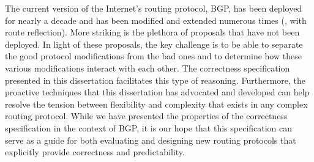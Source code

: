 The current version of the Internet's routing protocol, BGP, has been
deployed for nearly a decade and has been modified and extended numerous
times (\eg, with route reflection).  More striking is the plethora of
proposals that have not been deployed.  In light of these proposals, the
key challenge is to be able to separate the good protocol modifications
from the bad ones and to determine how these various modifications
interact with each other. 
The correctness specification presented in this dissertation facilitates
this type of reasoning. Furthermore, the proactive techniques that this
dissertation has advocated and developed can help resolve the tension
between flexibility and complexity that exists in any complex routing
protocol. 
While we have presented the properties of the correctness specification
in the context of BGP, it is our hope that this specification can serve
as a guide for both evaluating and designing new routing protocols that
explicitly provide correctness and predictability. 


